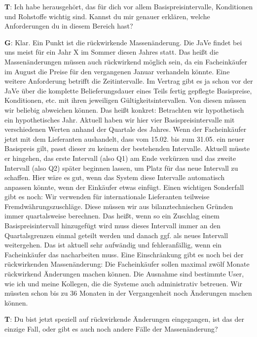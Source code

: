 \begin{list}{X:}{\setlength{\labelsep}{5mm}}
 \item[\textbf{T}:] Ich habe herausgehört, das für dich vor allem Basispreisintervalle, Konditionen und Rohstoffe wichtig sind. Kannst du mir genauer erklären, welche Anforderungen du in diesem Bereich hast?
 \item[\textbf{G}:] Klar. Ein Punkt ist die rückwirkende Massenänderung. Die JaVe findet bei uns meist für ein Jahr X im Sommer diesen Jahres statt. Das hei\ss t die Massenänderungen müssen auch rückwirkend möglich sein, da ein Facheinkäufer \zB im August die Preise für den vergangenen Januar verhandeln könnte. Eine weitere Anforderung betrifft die Zeitintervalle. Im Vertrag gibt es ja schon vor der JaVe über die komplette Belieferungsdauer eines Teils fertig gepflegte Basispreise, Konditionen, etc. mit ihren jeweiligen Gültigkeitsintervallen. Von diesen müssen wir beliebig abweichen können. Das hei\ss t konkret: Betrachten wir hypothetisch ein hypothetisches Jahr. Aktuell haben wir hier vier Basispreisintervalle mit verschiedenen Werten anhand der Quartale des Jahres. Wenn der Facheinkäufer jetzt mit dem Lieferanten aushandelt, dass vom 15.02. bis zum 31.05. ein neuer Basispreis gilt, passt dieser zu keinem der bestehenden Intervalle. Aktuell müsste er hingehen, das erste Intervall (also Q1) am Ende verkürzen und das zweite Intervall (also Q2) später beginnen lassen, um Platz für das neue Intervall zu schaffen. Hier wäre es gut, wenn das System diese Intervalle automatisch anpassen könnte, wenn der Einkäufer etwas einfügt. Einen wichtigen Sonderfall gibt es noch: Wir verwenden für internationale Lieferanten teilweise Fremdwährungszuschläge. Diese müssen wir aus bilanztechnischen Gründen immer quartalsweise berechnen. Das hei\ss t, wenn so ein Zuschlag einem Basispreisintervall hinzugefügt wird muss dieses Intervall immer an den Quartalsgrenzen einmal geteilt werden und danach ggf. als neues Intervall weitergehen. Das ist aktuell sehr aufwändig und fehleranfällig, wenn ein Facheinkäufer das nacharbeiten muss. Eine Einschränkung gibt es noch bei der rückwirkenden Massenänderung: Die Facheinkäufer sollen maximal zwölf Monate rückwirkend Änderungen machen können. Die Ausnahme sind bestimmte User, wie ich und meine Kollegen, die die Systeme auch administrativ betreuen. Wir müssten schon bis zu 36 Monaten in der Vergangenheit noch Änderungen machen können.
 \item[\textbf{T}:] Du bist jetzt speziell auf rückwirkende Änderungen eingegangen, ist das der einzige Fall, oder gibt es auch noch andere Fälle der Massenänderung?

\end{list}
